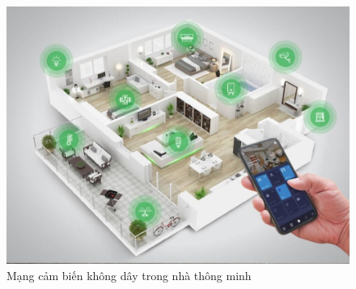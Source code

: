 \documentclass{report}
\begin{document}
\begin{figure}[h]
	\centering
	\includegraphics[scale = 0.3]{fig8.png}
	\caption{Mạng cảm biến không dây trong nhà thông minh}
	\label{fig:Graph8}
\end{figure}\\
\end{document}
